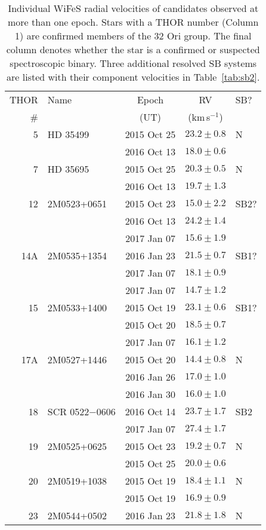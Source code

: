 \documentclass[usenatbib]{mnras}
\newcommand{\kms}{\textrm{km\,s$^{-1}$}}
\begin{document}
\begin{table}
\caption[]{Individual WiFeS radial velocities of candidates observed at more than one epoch.
Stars with a THOR number (Column 1) are confirmed
members of the 32 Ori group. The final column denotes whether the star is a confirmed or suspected spectroscopic binary. Three additional resolved SB systems are listed with their component velocities in Table~\ref{tab:sb2}.\label{tab:rvs}}
\begin{flushleft}
\begin{tabular}{r l c c l}
\hline
THOR & Name   &   Epoch   &  RV & SB?\\
\# & &  (UT) & (\kms)\\
\hline
5 & HD 35499 & 2015 Oct 25 & 	$23.2\pm0.8$ & N\\
& & 2016 Oct 13 &	$18.0 \pm	0.6$\\[2mm]
7 & HD 35695 & 2015 Oct 25 &	$20.3\pm0.5$ & N\\
& & 2016 Oct 13 & 	$19.7\pm	1.3$\\[2mm]
12 & 2M0523+0651 & 2015 Oct 23 &	$15.0\pm	2.2$ & SB2?\\
& & 2016 Oct 13 &	$24.2\pm	1.4$\\
& & 2017 Jan 07 & $15.6\pm	1.9$\\[2mm]
14A & 2M0535+1354 & 2016 Jan 23 & $21.5\pm	0.7$ & SB1?\\
& & 2017 Jan 07 & $18.1\pm	0.9$\\
& & 2017 Jan 07 & $14.7\pm	1.2$\\[2mm]
15 & 2M0533+1400 & 2015 Oct 19 &	$23.1\pm	0.6$ & SB1?\\
& & 2015 Oct 20 &	$18.5\pm	0.7$\\
& & 2017 Jan 07 & $16.1\pm	1.2$\\[2mm]
17A & 2M0527+1446 & 2015 Oct 20 & $14.4\pm	0.8$ & N\\
& & 2016 Jan 26 & $17.0\pm	1.0$\\
& & 2016 Jan 30 & $16.0\pm	1.0$\\[2mm]
18 & SCR 0522$-$0606 & 2016 Oct 14 & $23.7\pm	1.7$ & SB2\\
& & 2017 Jan 07 & $27.4\pm	1.7$\\[2mm]
19 & 2M0525+0625 & 2015 Oct 23 & $19.2\pm	0.7$ & N\\
& & 2015 Oct 25 & $20.0\pm	0.6$\\[2mm]
20 & 2M0519+1038 & 2015 Oct 19 &	$18.4\pm	1.1$ & N\\
& & 2015 Oct 19 & $16.9\pm	0.9$\\[2mm]
23 & 2M0544+0502 & 2016 Jan 23 &	$21.8\pm	1.8$ & N\\

\end{tabular}
\end{flushleft}
\end{table}
\end{document}
